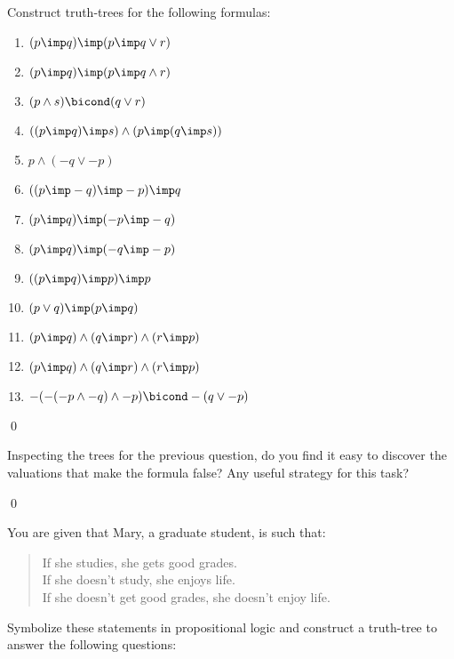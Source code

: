 \documentclass[11pt]{article}
\begin{document}
\begin{itemize}
\hrulefill
\begin{uexercise}\label{treecons}

Construct truth-trees for the following formulas:

\begin{enumerate}
\item $(p\imp q) \imp (p\imp q\lor r)$
\item $(p\imp q) \imp (p\imp q\land r)$
\item $(p\land s) \bicond (q \lor r)$
\item $((p\imp q) \imp s)\land (p\imp (q\imp s))$
\item $p\land (-q\lor -p)$
\item $((p\imp -q) \imp -p) \imp q$
\item $(p\imp q) \imp (-p \imp -q)$
\item $(p\imp q) \imp (-q \imp -p)$
\item $((p\imp q)\imp p) \imp p$
\item $(p\lor q) \imp (p\imp q)$
\item $(p\imp q) \land (q\imp r) \land (r\imp p)$
\item $(p\imp q) \land (q\imp r) \land (r\imp p)$
\item $-(-(-p\land -q)\land -p)\bicond -(q\lor -p)$

\end{enumerate}
\qed
\end{uexercise}
\hrulefill

\hrulefill
\begin{uexercise}\label{treeconsfol}
Inspecting the trees for the previous question, do you find it easy to discover
the valuations that make the formula false? Any useful strategy for this task?

\qed
\end{uexercise}
\hrulefill


\hrulefill
\begin{uexercise}\label{treeconsfol}
You are given that Mary, a graduate student, is such that:

\begin{quote}\small
If she studies, she  gets good grades.\\
If she doesn't study, she enjoys life.\\
If she doesn't get good grades, she doesn't enjoy life.
\end{quote}

Symbolize these statements in propositional logic and construct a truth-tree to
answer the following questions:


\end{uexercise}
\end{itemize}
\end{document}
